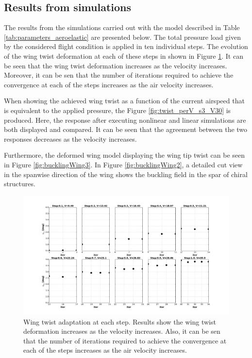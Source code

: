     \clearpage
    \subsection{Results from simulations} \label{subsec:results_aeroelastic}

      The results from the simulations carried out with the model described in Table \ref{tab:parameters_aeroelastic} are presented below. The total pressure load given by the considered flight condition is applied in ten individual steps. The evolution of the wing twist deformation at each of these steps in shown in Figure \ref{fig:twist_perIter_s3_V30}. It can be seen that the wing twist deformation increases as the velocity increases. Moreover, it can be sen that the number of iterations required to achieve the convergence at each of the steps increases as the air velocity increases.

      When showing the achieved wing twist as a function of the current airspeed that is equivalent to the applied pressure, the Figure \ref{fig:twist_perV_s3_V30} is produced. Here, the response after executing nonlinear and linear simulations are both displayed and compared. It can be seen that the agreement between the two responses decreases as the velocity increases.

      Furthermore, the deformed wing model displaying the wing tip twist can be seen in Figure \ref{fig:bucklingWing3}. In Figure \ref{fig:bucklingWing2}, a detailed cut view in the spanwise direction of the wing shows the buckling field in the spar of chiral structures.

      \begin{figure}[!htpb]
        \centering
        \includegraphics[width=0.95 \textwidth]{figures/wing-model/twist_perIter_s3_V30}
        \caption[Wing twist adaptation at each step]{Wing twist adaptation at each step. Results show the wing twist deformation increases as the velocity increases. Also, it can be sen that the number of iterations required to achieve the convergence at each of the steps increases as the air velocity increases.}
        \label{fig:twist_perIter_s3_V30}
      \end{figure}

